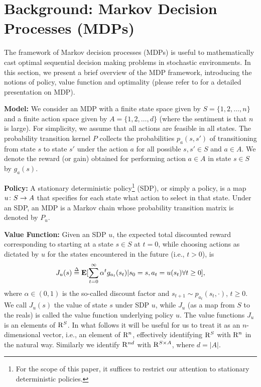 \section{Background: Markov Decision Processes (MDPs)}
The framework of Markov decision processes (MDPs) is useful to mathematically cast optimal sequential decision making problems in stochastic environments. In this section, we present a brief overview of the MDP framework, introducing the notions of policy, value function and optimality (please refer to \cite{BertB} for a detailed presentation on MDP).\par
\textbf{Model:} We consider an MDP with a finite state space given by $S=\{1,2,\ldots,n\}$ and a finite action space given by $A=\{1,2,\ldots,d\}$ (where the sentiment is that $n$ is large). For simplicity, we assume that all actions are feasible in all states. The probability transition kernel $P$ collects the probabilities $p_a(s,s')$ of transitioning from state $s$ to state $s'$ under the action $a$ for all possible $s,s'\in S$ and $a\in A$. We denote the reward (or gain) obtained for performing action $a\in A$ in state $s\in S$ by $g_a(s)$.\par
\textbf{Policy:} A stationary deterministic policy\footnote{For the scope of this paper, it suffices to restrict our attention to stationary deterministic policies.} (SDP), or simply a policy, is a map $u\colon S\rightarrow A$ that specifies for each state what action to select in that state. Under an SDP, an MDP is a Markov chain whose probability transition matrix is denoted by $P_u$.\par
\textbf{Value Function:} Given an SDP $u$, the expected total discounted reward corresponding to starting at a state $s\in S$ at $t=0$, while choosing actions as dictated by $u$ for the states encountered in the future (i.e., $t>0$), is
\begin{align}
J_u(s)\stackrel{\Delta}{=}\mathbf{E}[\sum_{t=0}^\infty \alpha^t g_{a_t}(s_t)|s_0=s,a_t=u(s_t)\relax{ }\forall t\geq 0],\nonumber
\end{align}
where $\alpha \in (0,1)$ is the so-called discount factor and $s_{t+1} \sim p_{a_t}(s_t,\cdot)$, $t\ge 0$.
We call $J_u(s)$ the value of state $s$ under SDP $u$, while $J_u$ (as a map from $S$ to the reals)
is called the value function underlying policy $u$. The value functions $J_u$ is an elements of $\mathrm{R}^S$. In what follows it will be useful for us to treat it as an $n$-dimensional vector, i.e., an element of $\mathrm{R}^n$, effectively identifying $\mathrm{R}^S$ with $\mathrm{R}^n$ in the natural way. Similarly we identify $\mathrm{R}^{nd}$ with $\mathrm{R}^{S\times A}$, where $d=|A|$.\par
